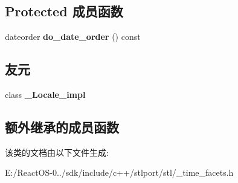 \subsection*{Protected 成员函数}
\begin{DoxyCompactItemize}
\item 
\mbox{\label{classtime__get__byname_a51e0c392fc26f83fde88576d77b8b9e2}} 
dateorder {\bfseries do\+\_\+date\+\_\+order} () const
\end{DoxyCompactItemize}
\subsection*{友元}
\begin{DoxyCompactItemize}
\item 
\mbox{\label{classtime__get__byname_ae9c09ac7cd16ad35f8fdb1587ac77eb8}} 
class {\bfseries \+\_\+\+Locale\+\_\+impl}
\end{DoxyCompactItemize}
\subsection*{额外继承的成员函数}


该类的文档由以下文件生成\+:\begin{DoxyCompactItemize}
\item 
E\+:/\+React\+O\+S-\/0../sdk/include/c++/stlport/stl/\+\_\+time\+\_\+facets.\+h\end{DoxyCompactItemize}
